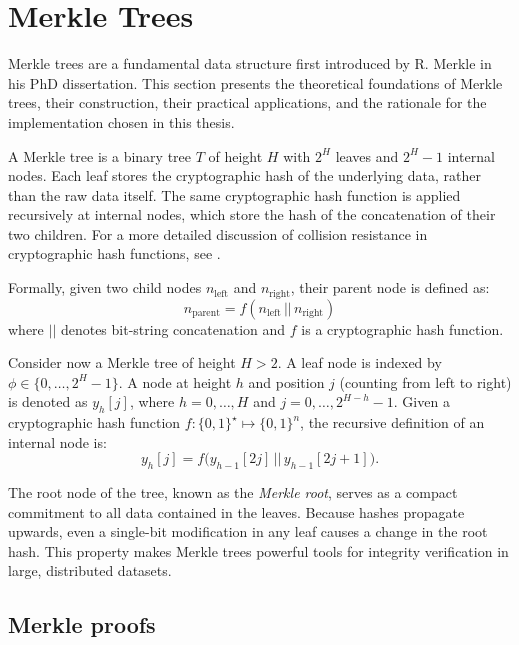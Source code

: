 \section{Merkle Trees}\label{section:merkle-trees}

Merkle trees \cite{merkle1979} are a fundamental data structure first introduced by R. Merkle in his PhD dissertation. This section presents the theoretical foundations of Merkle trees, their construction, their practical applications, and the rationale for the implementation chosen in this thesis.

A Merkle tree is a binary tree $T$ of height $H$ with $2^H$ leaves and $2^H - 1$ internal nodes.  
Each leaf stores the cryptographic hash of the underlying data, rather than the raw data itself. The same cryptographic hash function is applied recursively at internal nodes, which store the hash of the concatenation of their two children. For a more detailed discussion of collision resistance in cryptographic hash functions, see \cite{damgaard1987collision}.

Formally, given two child nodes $n_{\text{left}}$ and $n_{\text{right}}$, their parent node is defined as:
\begin{equation}
\label{equation:nparent}
    n_{\text{parent}} = f(n_{\text{left}} \, || \, n_{\text{right}})
\end{equation}
where $||$ denotes bit-string concatenation and $f$ is a cryptographic hash function.

Consider now a Merkle tree of height $H > 2$. A leaf node is indexed by $\phi \in \{0, \ldots, 2^H-1\}$. A node at height $h$ and position $j$ (counting from left to right) is denoted as $y_h[j]$, where $h = 0, \ldots, H$ and $j = 0, \ldots, 2^{H-h}-1$.  
Given a cryptographic hash function $f: \{0,1\}^\star \mapsto \{0,1\}^n$, the recursive definition of an internal node is:
\begin{equation}
    y_h[j] = f\big(y_{h-1}[2j] \, || \, y_{h-1}[2j+1]\big).
\end{equation}

The root node of the tree, known as the \emph{Merkle root}, serves as a compact commitment to all data contained in the leaves. Because hashes propagate upwards, even a single-bit modification in any leaf causes a change in the root hash. This property makes Merkle trees powerful tools for integrity verification in large, distributed datasets.


\subsection{Merkle proofs}

